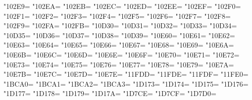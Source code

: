\XeTeXcharclass"102E9=\KclassNum
\XeTeXcharclass"102EA=\KclassNum
\XeTeXcharclass"102EB=\KclassNum
\XeTeXcharclass"102EC=\KclassNum
\XeTeXcharclass"102ED=\KclassNum
\XeTeXcharclass"102EE=\KclassNum
\XeTeXcharclass"102EF=\KclassNum
\XeTeXcharclass"102F0=\KclassNum
\XeTeXcharclass"102F1=\KclassNum
\XeTeXcharclass"102F2=\KclassNum
\XeTeXcharclass"102F3=\KclassNum
\XeTeXcharclass"102F4=\KclassNum
\XeTeXcharclass"102F5=\KclassNum
\XeTeXcharclass"102F6=\KclassNum
\XeTeXcharclass"102F7=\KclassNum
\XeTeXcharclass"102F8=\KclassNum
\XeTeXcharclass"102F9=\KclassNum
\XeTeXcharclass"102FA=\KclassNum
\XeTeXcharclass"102FB=\KclassNum
\XeTeXcharclass"10D30=\KclassNum
\XeTeXcharclass"10D31=\KclassNum
\XeTeXcharclass"10D32=\KclassNum
\XeTeXcharclass"10D33=\KclassNum
\XeTeXcharclass"10D34=\KclassNum
\XeTeXcharclass"10D35=\KclassNum
\XeTeXcharclass"10D36=\KclassNum
\XeTeXcharclass"10D37=\KclassNum
\XeTeXcharclass"10D38=\KclassNum
\XeTeXcharclass"10D39=\KclassNum
\XeTeXcharclass"10E60=\KclassNum
\XeTeXcharclass"10E61=\KclassNum
\XeTeXcharclass"10E62=\KclassNum
\XeTeXcharclass"10E63=\KclassNum
\XeTeXcharclass"10E64=\KclassNum
\XeTeXcharclass"10E65=\KclassNum
\XeTeXcharclass"10E66=\KclassNum
\XeTeXcharclass"10E67=\KclassNum
\XeTeXcharclass"10E68=\KclassNum
\XeTeXcharclass"10E69=\KclassNum
\XeTeXcharclass"10E6A=\KclassNum
\XeTeXcharclass"10E6B=\KclassNum
\XeTeXcharclass"10E6C=\KclassNum
\XeTeXcharclass"10E6D=\KclassNum
\XeTeXcharclass"10E6E=\KclassNum
\XeTeXcharclass"10E6F=\KclassNum
\XeTeXcharclass"10E70=\KclassNum
\XeTeXcharclass"10E71=\KclassNum
\XeTeXcharclass"10E72=\KclassNum
\XeTeXcharclass"10E73=\KclassNum
\XeTeXcharclass"10E74=\KclassNum
\XeTeXcharclass"10E75=\KclassNum
\XeTeXcharclass"10E76=\KclassNum
\XeTeXcharclass"10E77=\KclassNum
\XeTeXcharclass"10E78=\KclassNum
\XeTeXcharclass"10E79=\KclassNum
\XeTeXcharclass"10E7A=\KclassNum
\XeTeXcharclass"10E7B=\KclassNum
\XeTeXcharclass"10E7C=\KclassNum
\XeTeXcharclass"10E7D=\KclassNum
\XeTeXcharclass"10E7E=\KclassNum
\XeTeXcharclass"11FDD=\KclassNum
\XeTeXcharclass"11FDE=\KclassNum
\XeTeXcharclass"11FDF=\KclassNum
\XeTeXcharclass"11FE0=\KclassNum
\XeTeXcharclass"1BCA0=\KclassNum
\XeTeXcharclass"1BCA1=\KclassNum
\XeTeXcharclass"1BCA2=\KclassNum
\XeTeXcharclass"1BCA3=\KclassNum
\XeTeXcharclass"1D173=\KclassNum
\XeTeXcharclass"1D174=\KclassNum
\XeTeXcharclass"1D175=\KclassNum
\XeTeXcharclass"1D176=\KclassNum
\XeTeXcharclass"1D177=\KclassNum
\XeTeXcharclass"1D178=\KclassNum
\XeTeXcharclass"1D179=\KclassNum
\XeTeXcharclass"1D17A=\KclassNum
\XeTeXcharclass"1D7CE=\KclassNum
\XeTeXcharclass"1D7CF=\KclassNum
\XeTeXcharclass"1D7D0=\KclassNum
